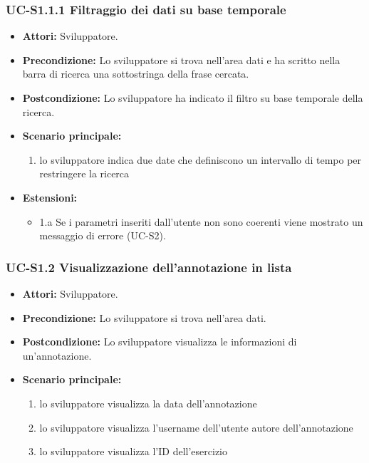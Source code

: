 	\subsubsection{UC-S1.1.1 Filtraggio dei dati su base temporale}	
		\begin{itemize}
			\item \textbf{Attori:} Sviluppatore.
			\item \textbf{Precondizione:} Lo sviluppatore si trova nell'area dati e ha scritto nella barra di ricerca una sottostringa della frase cercata.
			\item \textbf{Postcondizione:} Lo sviluppatore ha indicato il filtro su base temporale della ricerca.
			\item \textbf{Scenario principale:}
				\begin{enumerate}
					\item lo sviluppatore indica due date che definiscono un intervallo di tempo per restringere la ricerca
				\end{enumerate}
			\item \textbf{Estensioni:}
				\begin{itemize}
					\item 1.a Se i parametri inseriti dall'utente non sono coerenti viene mostrato un messaggio di errore (UC-S2).
				\end{itemize}		
		\end{itemize}
			
\subsubsection{UC-S1.2 Visualizzazione dell'annotazione in lista}
		\begin{itemize}
			\item \textbf{Attori:} Sviluppatore.
			\item \textbf{Precondizione:} Lo sviluppatore si trova nell'area dati.
			\item \textbf{Postcondizione:} Lo sviluppatore visualizza le informazioni di un'annotazione.
			\item \textbf{Scenario principale:}
				\begin{enumerate}
					\item lo sviluppatore visualizza la data dell'annotazione
					\item lo sviluppatore visualizza l'username dell'utente autore dell'annotazione
					\item lo sviluppatore visualizza l'ID dell'esercizio
				\end{enumerate}
		\end{itemize}

